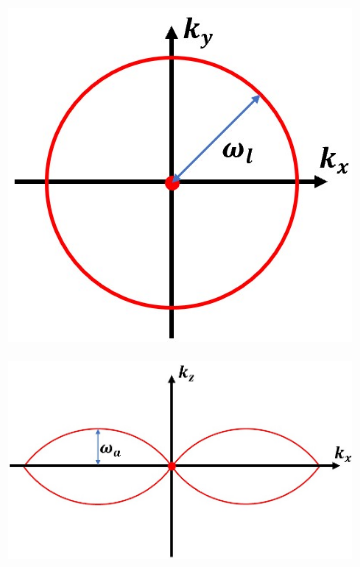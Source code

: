 \begin{figure}[h]
	\centering
	\begin{subfigure}[t]{0.23\textwidth}
		\centering
		\includegraphics[width=\linewidth]{images/3D_SIM_OTF_no_angle_2D_plot_xy_k_l.jpg}
		\caption{}
		\label{fig:WF_OTF_xy}
	\end{subfigure}
	\begin{subfigure}[t]{0.4\textwidth}
		\centering
		\includegraphics[width=\linewidth]{images/3D_SIM_OTF_no_angle_2D_plot_xz_k_a.jpg}
		\caption{}
		\label{fig:WF_OTF_xz}
	\end{subfigure}
	\begin{subfigure}[t]{0.27\textwidth}
		\centering

\end{subfigure}
\end{figure}
